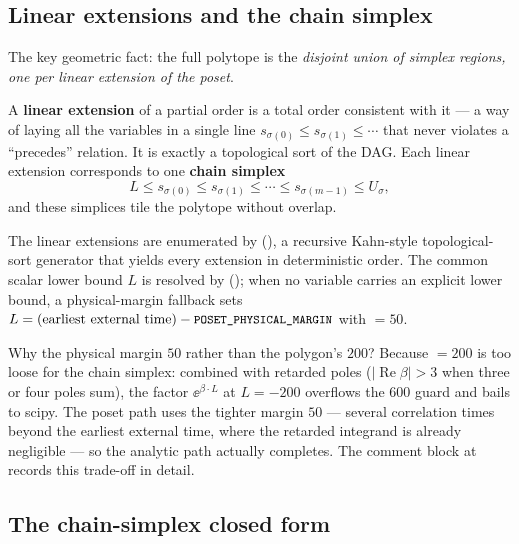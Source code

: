 \subsection{Linear extensions and the chain simplex}

The key geometric fact: the full polytope is the \emph{disjoint union of simplex
regions, one per linear extension of the poset}.

\begin{defn}
A \textbf{linear extension} of a partial order is a total order consistent with
it --- a way of laying all the variables in a single line $s_{\sigma(0)} \le
s_{\sigma(1)} \le \cdots$ that never violates a ``precedes'' relation. It is
exactly a topological sort of the DAG. Each linear extension corresponds to one
\textbf{chain simplex}
\[
  L \le s_{\sigma(0)} \le s_{\sigma(1)} \le \cdots \le s_{\sigma(m-1)} \le U_\sigma,
\]
and these simplices tile the polytope without overlap.
\end{defn}

The linear extensions are enumerated by 
(), a recursive Kahn-style topological-sort generator
that yields every extension in deterministic order. The common scalar lower bound
$L$ is resolved by 
(); when no variable carries an explicit lower bound,
a physical-margin fallback sets $L = (\text{earliest external time}) -
\texttt{\small POSET\_PHYSICAL\_MARGIN}$ with  $= 50$.

\begin{gotcha}
Why the physical margin $50$ rather than the polygon's $200$? Because
$=200$ is too loose for the chain simplex: combined with
retarded poles ($|\operatorname{Re}\beta| > 3$ when three or four poles sum), the
factor $\ee^{\beta\cdot L}$ at $L=-200$ overflows the $600$ guard and bails to
scipy. The poset path uses the tighter margin $50$ --- several correlation times
beyond the earliest external time, where the retarded integrand is already
negligible --- so the analytic path actually completes. The comment block at
 records this trade-off in detail.
\end{gotcha}

\subsection{The chain-simplex closed form}

